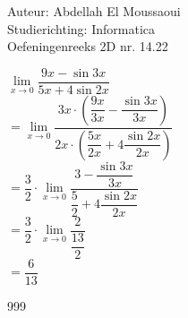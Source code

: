 \documentclass[a4paper]{article}
\begin{document}
  
\noindent \large Auteur: Abdellah El Moussaoui \\
\noindent \large Studierichting: Informatica\\
\noindent \large Oefeningenreeks 2D nr. 14.22\\

\medskip

\normalsize


$\lim\limits_{x\to0} \dfrac{9x-\sin3x}{5x+4\sin2x}$\\


$ = \lim\limits_{x\to0} \dfrac{3x\cdot \left(\dfrac{9x}{3x}-\dfrac{\sin3x}{3x}\right)}{2x \cdot \left(\dfrac{5x}{2x}+4\dfrac{\sin2x}{2x}\right)}$\\


$ = \dfrac{3}{2} \cdot \lim\limits_{x\to0} \dfrac{3-\dfrac{\sin3x}{3x}}{\dfrac{5}{2}+4\dfrac{\sin2x}{2x}}$\\


$ = \dfrac{3}{2} \cdot \lim\limits_{x\to0} \dfrac{2}{\dfrac{13}{2}}$\\

$ = \dfrac{6}{13}$\\


\begin{thebibliography}{999}
\end{thebibliography}
\end{document}
